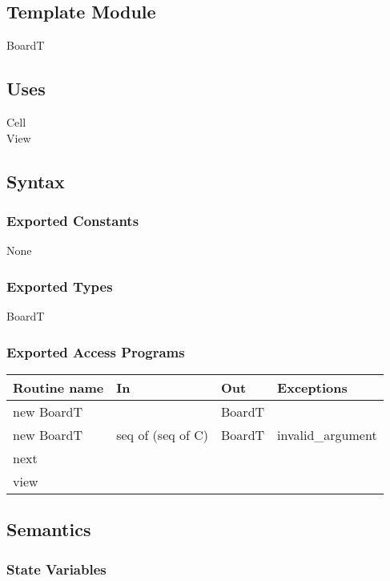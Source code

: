 \documentclass[12pt]{article}
\begin{document}
\subsection*{Template Module}

BoardT

\subsection* {Uses}

\noindent Cell\\
\noindent View

\subsection* {Syntax}

\subsubsection* {Exported Constants}

None

\subsubsection* {Exported Types}

BoardT

\subsubsection* {Exported Access Programs}

\begin{tabular}{| l | l | l | l |}
\hline
\textbf{Routine name} & \textbf{In} & \textbf{Out} & \textbf{Exceptions}\\
\hline
new BoardT & & BoardT &\\
\hline
new BoardT  & seq of (seq of C) & BoardT & invalid\_argument\\
\hline
next & & &\\
\hline
view & & &\\
\hline

\hline
\end{tabular}

\subsection* {Semantics}

\subsubsection* {State Variables}
\end{document}
